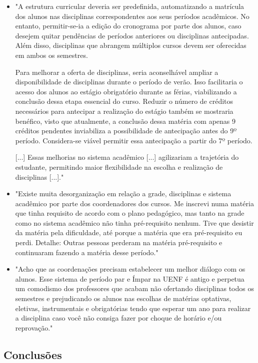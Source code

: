 \begin{itemize}
  \item "A estrutura curricular deveria ser predefinida, automatizando a matrícula dos alunos nas disciplinas correspondentes aos seus períodos acadêmicos. No entanto, permitir-se-ia a edição do cronograma por parte dos alunos, caso desejem quitar pendências de períodos anteriores ou disciplinas antecipadas. Além disso, disciplinas que abrangem múltiplos cursos devem ser oferecidas em ambos os semestres.

        Para melhorar a oferta de disciplinas, seria aconselhável ampliar a disponibilidade de disciplinas durante o período de verão. Isso facilitaria o acesso dos alunos ao estágio obrigatório durante as férias, viabilizando a conclusão dessa etapa essencial do curso. Reduzir o número de créditos necessários para antecipar a realização do estágio também se mostraria benéfico, visto que atualmente, a conclusão dessa matéria com apenas 9 créditos pendentes inviabiliza a possibilidade de antecipação antes do 9º período. Considera-se viável permitir essa antecipação a partir do 7º período.

        [...]
        Essas melhorias no sistema acadêmico [...] agilizariam a trajetória do estudante, permitindo maior flexibilidade na escolha e realização de disciplinas [...]."
  \item "Existe muita desorganização em relação a grade, disciplinas e sistema acadêmico por parte dos coordenadores dos cursos. Me inscrevi numa matéria que tinha requisito de acordo com o plano pedagógico, mas tanto na grade como no sistema acadêmico não tinha pré-requisito nenhum. Tive que desistir da matéria pela dificuldade, até porque a matéria que era pré-requisito eu perdi. Detalhe: Outras pessoas perderam na matéria pré-requisito e continuaram fazendo a matéria desse período."
  \item "Acho que as coordenações precisam estabelecer um melhor diálogo com os alunos. Esse sistema de período par e Ímpar na UENF é antigo e perpetua um comodismo dos professores que acabam não ofertando disciplinas todos os semestres e prejudicando os alunos nas escolhas de matérias optativas, eletivas, instrumentais e obrigatórias tendo que esperar um ano para realizar a disciplina caso você não consiga fazer por choque de horário e/ou reprovação."
\end{itemize}

\subsection{Conclusões} %

